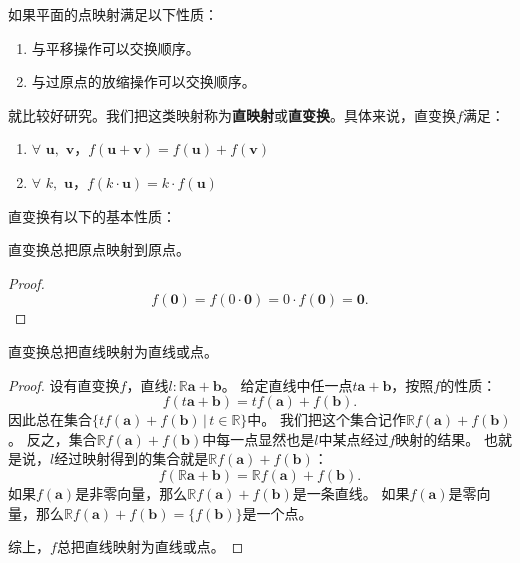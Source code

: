 \documentclass[12pt,UTF8]{ctexbook}
\begin{document}
如果平面的点映射满足以下性质：
\begin{enumerate}
    \item 与平移操作可以交换顺序。
    \item 与过原点的放缩操作可以交换顺序。
\end{enumerate}
就比较好研究。我们把这类映射称为\textbf{直映射}或\textbf{直变换}。具体来说，直变换$f$满足：
\begin{enumerate}
    \item $\forall \,\,\mathbf{u}, \,\,\mathbf{v}$，$f(\mathbf{u} + \mathbf{v}) = f(\mathbf{u}) + f(\mathbf{v})$
    \item $\forall \,\,k, \,\, \mathbf{u}$，$f(k\cdot \mathbf{u}) = k \cdot f(\mathbf{u})$
\end{enumerate}
直变换有以下的基本性质：
\begin{tm}
    直变换总把原点映射到原点。
\end{tm}
\begin{proof}
    $$f(\mathbf{0}) = f(0\cdot \mathbf{0}) = 0 \cdot f(\mathbf{0}) = \mathbf{0}.$$
\end{proof}
\begin{tm}
    直变换总把直线映射为直线或点。
\end{tm}
\begin{proof}
    设有直变换$f$，直线$l: \mathbb{R}\mathbf{a} + \mathbf{b}$。
    给定直线中任一点$t\mathbf{a} + \mathbf{b}$，按照$f$的性质：
    $$ f(t\mathbf{a} + \mathbf{b}) = tf(\mathbf{a}) + f(\mathbf{b}).$$
    因此总在集合$\{tf(\mathbf{a}) + f(\mathbf{b})\,|\, t\in\mathbb{R}\}$中。
    我们把这个集合记作$\mathbb{R}f(\mathbf{a}) + f(\mathbf{b})$。
    反之，集合$\mathbb{R}f(\mathbf{a}) + f(\mathbf{b})$中每一点显然也是$l$中某点经过$f$映射的结果。
    也就是说，$l$经过映射得到的集合就是$\mathbb{R}f(\mathbf{a}) + f(\mathbf{b})$：
    $$ f(\mathbb{R}\mathbf{a} + \mathbf{b}) = \mathbb{R}f(\mathbf{a}) + f(\mathbf{b}).$$
    如果$f(\mathbf{a})$是非零向量，那么$\mathbb{R}f(\mathbf{a}) + f(\mathbf{b})$是一条直线。
    如果$f(\mathbf{a})$是零向量，那么$\mathbb{R}f(\mathbf{a}) + f(\mathbf{b}) = \{f(\mathbf{b})\}$是一个点。

    综上，$f$总把直线映射为直线或点。
\end{proof}
\end{document}
